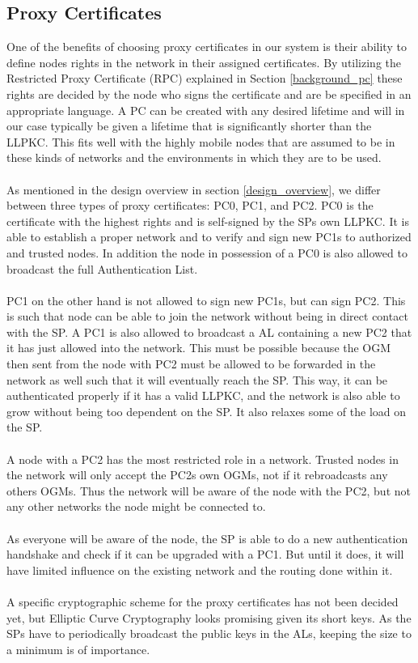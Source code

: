 \subsection{Proxy Certificates}
One of the benefits of choosing proxy certificates in our system is their ability to define nodes rights in the network in their assigned certificates. By utilizing the Restricted Proxy Certificate (RPC) explained in Section \ref{background_pc} these rights are decided by the node who signs the certificate and are be specified in an appropriate language. A PC can be created with any desired lifetime and will in our case typically be given a lifetime that is significantly shorter than the LLPKC. This fits well with the highly mobile nodes that are assumed to be in these kinds of networks and the environments in which they are to be used.
\\\\
As mentioned in the design overview in section \ref{design_overview}, we differ between three types of proxy certificates: PC0, PC1, and PC2. PC0 is the certificate with the highest rights and is self-signed by the SPs own LLPKC. It is able to establish a proper network and to verify and sign new PC1s to authorized and trusted nodes. In addition the node in possession of a PC0 is also allowed to broadcast the full Authentication List.
\\\\
PC1 on the other hand is not allowed to sign new PC1s, but can sign PC2. This is such that node can be able to join the network without being in direct contact with the SP. A PC1 is also allowed to broadcast a AL containing a new PC2 that it has just allowed into the network. This must be possible because the OGM then sent from the node with PC2 must be allowed to be forwarded in the network as well such that it will eventually reach the SP. This way, it can be authenticated properly if it has a valid LLPKC, and the network is also able to grow without being too dependent on the SP. It also relaxes some of the load on the SP.
\\\\
A node with a PC2 has the most restricted role in a network. Trusted nodes in the network will only accept the PC2s own OGMs, not if it rebroadcasts any others OGMs. Thus the network will be aware of the node with the PC2, but not any other networks the node might be connected to. %
\\\\
As everyone will be aware of the node, the SP is able to do a new authentication handshake and check if it can be upgraded with a PC1. But until it does, it will have limited influence on the existing network and the routing done within it.
\\\\
A specific cryptographic scheme for the proxy certificates has not been decided yet, but Elliptic Curve Cryptography looks promising given its short keys. As the SPs have to periodically broadcast the public keys in the ALs, keeping the size to a minimum is of importance.


